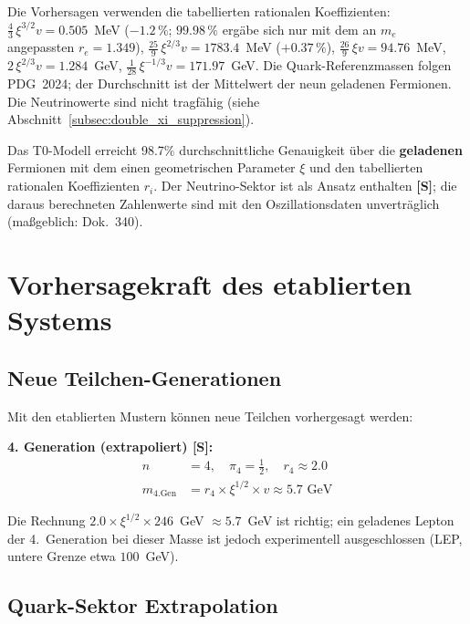 	Die Vorhersagen verwenden die tabellierten rationalen Koeffizienten: $\tfrac{4}{3}\,\xi^{3/2}v = 0.505$~MeV ($-1.2\,\%$; $99.98\,\%$ ergäbe sich nur mit dem an $m_e$ angepassten $r_e = 1.349$), $\tfrac{25}{9}\,\xi^{2/3}v = 1783.4$~MeV ($+0.37\,\%$), $\tfrac{26}{9}\,\xi v = 94.76$~MeV, $2\,\xi^{2/3}v = 1.284$~GeV, $\tfrac{1}{28}\,\xi^{-1/3}v = 171.97$~GeV. Die Quark-Referenzmassen folgen PDG~2024; der Durchschnitt ist der Mittelwert der neun geladenen Fermionen. Die Neutrinowerte sind nicht tragfähig (siehe Abschnitt~\ref{subsec:double_xi_suppression}).
	
	\begin{keyresult}
		Das T0-Modell erreicht 98.7\% durchschnittliche Genauigkeit über die \textbf{geladenen} Fermionen mit dem einen geometrischen Parameter $\xi$ und den tabellierten rationalen Koeffizienten $r_i$. Der Neutrino-Sektor ist als Ansatz enthalten \textbf{[S]}; die daraus berechneten Zahlenwerte sind mit den Oszillationsdaten unverträglich (maßgeblich: Dok.~340).
	\end{keyresult}
	
	\section{Vorhersagekraft des etablierten Systems}
	\label{sec:vorhersagekraft}
	
	\subsection{Neue Teilchen-Generationen}
	\label{subsec:neue_generationen}
	
	Mit den etablierten Mustern können neue Teilchen vorhergesagt werden:
	
	\textbf{4. Generation (extrapoliert) [S]:}
	\begin{align}
		n &= 4, \quad \pi_4 = \frac{1}{2}, \quad r_4 \approx 2.0 \\
		m_{\text{4.Gen}} &= r_4 \times \xi^{1/2} \times v \approx 5.7 \text{ GeV}
	\end{align}
	
	Die Rechnung $2.0 \times \xi^{1/2} \times 246$~GeV $\approx 5.7$~GeV ist richtig; ein geladenes Lepton der 4.~Generation bei dieser Masse ist jedoch experimentell ausgeschlossen (LEP, untere Grenze etwa $100$~GeV).
	
	\subsection{Quark-Sektor Extrapolation}
	\label{subsec:quark_extrapolation}
	
